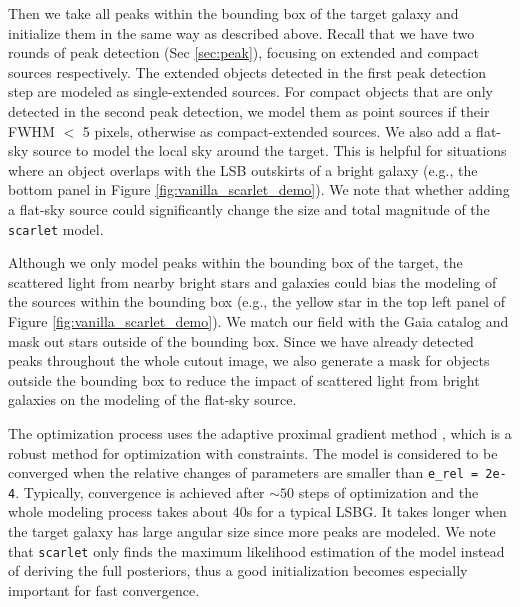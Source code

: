 \documentclass[twocolumn,astrosymb,twocolappendix]{aastex631}
\newcommand{\code}[1]{\texttt{#1}}
\begin{document}
\begin{CJK*}{UTF8}{gbsn}
Then we take all peaks within the bounding box of the target galaxy and initialize them in the same way as described above. Recall that we have two rounds of peak detection (Sec \ref{sec:peak}), focusing on extended and compact sources respectively. The extended objects detected in the first peak detection step are modeled as single-extended sources. For compact objects that are only detected in the second peak detection, we model them as point sources if their FWHM $<$ 5 pixels, otherwise as compact-extended sources. We also add a flat-sky source to model the local sky around the target. This is helpful for situations where an object overlaps with the LSB outskirts of a bright galaxy (e.g., the bottom panel in Figure \ref{fig:vanilla_scarlet_demo}). We note that whether adding a flat-sky source could significantly change the size and total magnitude of the \code{scarlet} model.

Although we only model peaks within the bounding box of the target, the scattered light from nearby bright stars and galaxies could bias the modeling of the sources within the bounding box (e.g., the yellow star in the top left panel of Figure \ref{fig:vanilla_scarlet_demo}). We match our field with the Gaia catalog \citep{GAIA2016,GAIA2018} and mask out stars outside of the bounding box. Since we have already detected peaks throughout the whole cutout image, we also generate a mask for objects outside the bounding box to reduce the impact of scattered light from bright galaxies on the modeling of the flat-sky source. 

The optimization process uses the adaptive proximal gradient method \citep{Melchior2019}, which is a robust method for optimization with constraints. The model is considered to be converged when the relative changes of parameters are smaller than \code{e\_rel\,=\,2e-4}. Typically, convergence is achieved after $\sim 50$ steps of optimization and the whole modeling process takes about 40s for a typical LSBG. It takes longer when the target galaxy has large angular size since more peaks are modeled. We note that \code{scarlet} only finds the maximum likelihood estimation of the model instead of deriving the full posteriors, thus a good initialization becomes especially important for fast convergence. 



\end{CJK*}
\end{document}

